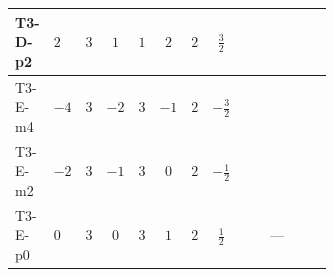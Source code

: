 \documentclass[8pt]{article}
\begin{document}
\begin{landscape}
\begin{longtable}{@{}llcccccc >{\raggedright\arraybackslash}p{0.21\linewidth} >{\raggedright\arraybackslash}p{0.21\linewidth} >{\raggedright\arraybackslash}p{0.21\linewidth}@{}}
\midrule
T3-D-p2 & $2$ & $3$ & $1$ & $1$ & $2$ & $2$ & $\frac{3}{2}$ & \scriptsize\adjustbox{max width=\linewidth}{$\begin{gathered} -\frac{33 {g_2}^2 {\lambda_{HS_1}^{(1)}}}{2}\end{gathered}$} & \scriptsize\adjustbox{max width=\linewidth}{$\begin{gathered} +3 {g_1}^4\end{gathered}$} & \scriptsize\adjustbox{max width=\linewidth}{$\begin{gathered} -\frac{15 {g_1}^2 {\lambda_{HS_1}^{(1)}}}{2}\end{gathered}$} \\
\midrule
T3-E-m4 & $-4$ & $3$ & $-2$ & $3$ & $-1$ & $2$ & $-\frac{3}{2}$ & \scriptsize\adjustbox{max width=\linewidth}{$\begin{gathered} -\frac{33 {g_2}^2 {\lambda_{HS_1}^{(1)}}}{2}\end{gathered}$} & \scriptsize\adjustbox{max width=\linewidth}{$\begin{gathered} +12 {g_1}^4\end{gathered}$} & \scriptsize\adjustbox{max width=\linewidth}{$\begin{gathered} -\frac{51 {g_1}^2 {\lambda_{HS_1}^{(1)}}}{2}\end{gathered}$} \\
\midrule
T3-E-m2 & $-2$ & $3$ & $-1$ & $3$ & $0$ & $2$ & $-\frac{1}{2}$ & \scriptsize\adjustbox{max width=\linewidth}{$\begin{gathered} -\frac{33 {g_2}^2 {\lambda_{HS_1}^{(1)}}}{2}\end{gathered}$} & \scriptsize\adjustbox{max width=\linewidth}{$\begin{gathered} +3 {g_1}^4\end{gathered}$} & \scriptsize\adjustbox{max width=\linewidth}{$\begin{gathered} -\frac{15 {g_1}^2 {\lambda_{HS_1}^{(1)}}}{2}\end{gathered}$} \\
\midrule
T3-E-p0 & $0$ & $3$ & $0$ & $3$ & $1$ & $2$ & $\frac{1}{2}$ & \scriptsize\adjustbox{max width=\linewidth}{$\begin{gathered} -\frac{33 {g_2}^2 {\lambda_{HS_1}^{(1)}}}{2}\end{gathered}$} & --- & \scriptsize\adjustbox{max width=\linewidth}{$\begin{gathered} -\frac{3 {g_1}^2 {\lambda_{HS_1}^{(1)}}}{2}\end{gathered}$} \\

\end{longtable}
\end{landscape}
\end{document}
